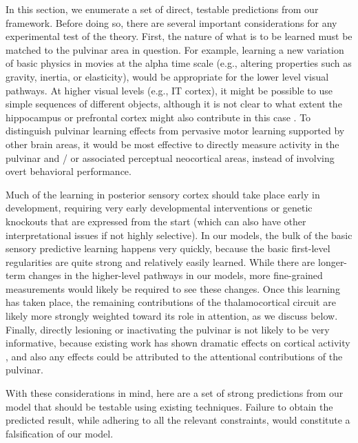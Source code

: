\documentclass[11pt,twoside]{article}
\newif\myifpdf
\begin{document}
In this section, we enumerate a set of direct, testable predictions from our framework.  Before doing so, there are several important considerations for any experimental test of the theory.  First, the nature of what is to be learned must be matched to the pulvinar area in question.  For example, learning a new variation of basic physics in movies at the alpha time scale (e.g., altering properties such as gravity, inertia, or elasticity), would be appropriate for the lower level visual pathways.  At higher visual levels (e.g., IT cortex), it might be possible to use simple sequences of different objects, although it is not clear to what extent the hippocampus or prefrontal cortex might also contribute in this case \citep{GavornikBear14,FiserMahringerOyiboEtAl16}.  To distinguish pulvinar learning effects from pervasive motor learning supported by other brain areas, it would be most effective to directly measure activity in the pulvinar and / or associated perceptual neocortical areas, instead of involving overt behavioral performance.

Much of the learning in posterior sensory cortex should take place early in development, requiring very early developmental interventions or genetic knockouts that are expressed from the start (which can also have other interpretational issues if not highly selective).  In our models, the bulk of the basic sensory predictive learning happens very quickly, because the basic first-level regularities are quite strong and relatively easily learned.  While there are longer-term changes in the higher-level pathways in our models, more fine-grained measurements would likely be required to see these changes.  Once this learning has taken place, the remaining contributions of the thalamocortical circuit are likely more strongly weighted toward its role in attention, as we discuss below.  Finally, directly lesioning or inactivating the pulvinar is not likely to be very informative, because existing work has shown dramatic effects on cortical activity \citep{ZhouSchaferDesimone16,PurushothamanMarionLiEtAl12}, and also any effects could be attributed to the attentional contributions of the pulvinar.

With these considerations in mind, here are a set of strong predictions from our model that should be testable using existing techniques.  Failure to obtain the predicted result, while adhering to all the relevant constraints, would constitute a falsification of our model.
\end{document}
